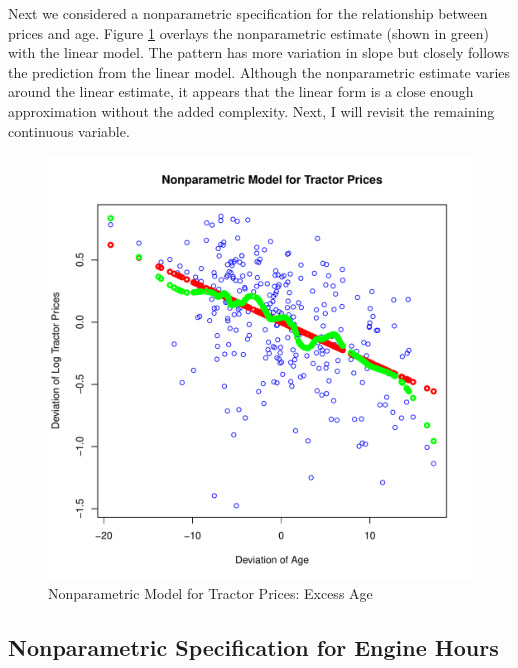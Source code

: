 \documentclass[11pt]{paper}
\begin{document}
Next we considered a nonparametric specification for 
the relationship between prices and age.
% 
Figure \ref{fig:dev_np_vs_age_dev} 
overlays the nonparametric estimate (shown in green) 
with the linear model.
The pattern has more variation in slope but 
closely follows the prediction from the linear model. 
Although the nonparametric estimate varies around the linear estimate,
it appears that the linear form
is a close enough approximation without the added complexity.
Next, I will revisit the remaining continuous variable.


\begin{figure}[h!]
  \centering
  \includegraphics[scale = 0.5, keepaspectratio=true]{../Figures/dev_np_vs_age_dev}
  \caption{Nonparametric Model for Tractor Prices: Excess Age} \label{fig:dev_np_vs_age_dev}
\end{figure}





\clearpage
\subsection{Nonparametric Specification for Engine Hours}
\end{document}
